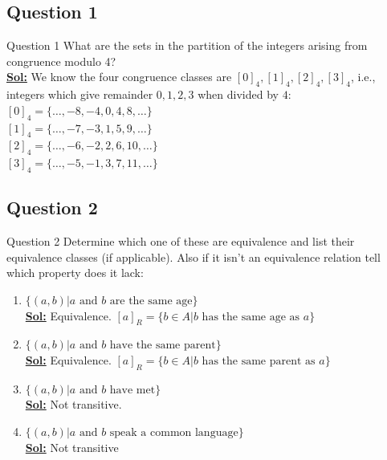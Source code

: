 \documentclass[xcolor=svgnames]{beamer}
\begin{document}
\subsection{Question 1}

\begin{frame}{Question 1}
        What are the sets in the partition of the integers arising from congruence modulo 4? \\
        \textbf{\underline{Sol:}} We know the four congruence classes are $[0]_4, [1]_4, [2]_4, [3]_4$, i.e., integers which give remainder $0, 1, 2, 3$ when divided by $4$:\\
        $[0]_4 = \{\dots, -8, -4, 0, 4, 8, \ldots\}$\\
        $[1]_4 = \{\dots, -7, -3, 1, 5, 9, \ldots\}$\\
        $[2]_4 = \{\dots, -6, -2, 2, 6, 10, \ldots\}$\\
        $[3]_4 = \{\dots, -5, -1, 3, 7, 11, \ldots\}$\\
\end{frame}

\subsection{Question 2}

\begin{frame}{Question 2}
    Determine which one of these are equivalence and list their equivalence classes (if applicable). Also if it isn't an equivalence relation tell which property does it lack:
    \begin{enumerate}
        \item $\{(a,b) | a \text{ and } b \text{ are the same age}\}$ \\
        \textbf{\underline{Sol:}} Equivalence. $[a]_R = \{b \in A | b \text{ has the same age as } a\}$
        \item $\{(a, b) | a \text{ and } b \text{ have the same parent}\}$ \\
        \textbf{\underline{Sol:}} Equivalence. $[a]_R = \{b \in A | b \text{ has the same parent as } a\}$
        \item $\{(a, b) | a \text{ and } b \text{ have met}\}$ \\ 
        \textbf{\underline{Sol:}} Not transitive. 
        \item $\{(a, b) | a \text{ and } b \text{ speak a common language}\}$ \\
        \textbf{\underline{Sol:}} Not transitive
    \end{enumerate}
\end{frame}
\end{document}
